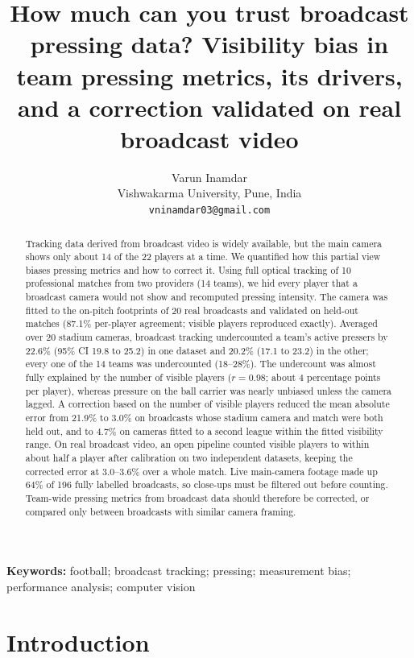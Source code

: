 \documentclass[11pt]{article}
\title{How much can you trust broadcast pressing data? Visibility bias in team pressing metrics, its drivers, and a
correction validated on real broadcast video}
\author{Varun Inamdar\\
Vishwakarma University, Pune, India\\
\texttt{vninamdar03@gmail.com}}
\date{}
\begin{document}
\maketitle
\doublespacing
\linenumbers

\begin{abstract}
Tracking data derived from broadcast video is widely available, but the main camera shows only about 14 of the 22
players at a time. We quantified how this partial view biases pressing metrics and how to correct it. Using full
optical tracking of 10 professional matches from two providers (14 teams), we hid every player that a broadcast camera
would not show and recomputed pressing intensity. The camera was fitted to the on-pitch footprints of 20 real
broadcasts and validated on held-out matches (87.1\% per-player agreement; visible players reproduced exactly).
Averaged over 20 stadium cameras, broadcast tracking undercounted a team's active pressers by 22.6\% (95\% CI 19.8 to
25.2) in one dataset and 20.2\% (17.1 to 23.2) in the other; every one of the 14 teams was undercounted (18--28\%).
The undercount was almost fully explained by the number of visible players ($r = 0.98$; about 4 percentage points per
player), whereas pressure on the ball carrier was nearly unbiased unless the camera lagged. A correction based on the
number of visible players reduced the mean absolute error from 21.9\% to 3.0\% on broadcasts whose stadium camera and
match were both held out, and to 4.7\% on cameras fitted to a second league within the fitted visibility range. On
real broadcast video, an open pipeline counted visible players to within about half a player after calibration on
two independent datasets, keeping the corrected error at 3.0--3.6\% over a whole match. Live main-camera footage made up 64\% of 196
fully labelled broadcasts, so close-ups must be filtered out before counting. Team-wide pressing metrics from
broadcast data should therefore be corrected, or compared only between broadcasts with similar camera framing.
\end{abstract}

\noindent\textbf{Keywords:} football; broadcast tracking; pressing; measurement bias; performance analysis;
computer vision

\section{Introduction}
\end{document}
